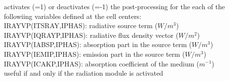 {activates (=1) or deactivates (=-1) the post-processing for the each of the
followiing variables defined at the cell centers:\\
\hspace*{1.3cm} IRAYVP(ITSRAY,IPHAS): radiative source term ($W/m^3$)\\
\hspace*{1.3cm} IRAYVP(IQRAYP,IPHAS): radiative flux density vector ($W/m^2$)\\
\hspace*{1.3cm} IRAYVP(IABSP,IPHAS): absorption part in the source term
($W/m^3$)\\
\hspace*{1.3cm} IRAYVP(IEMIP,IPHAS): emission part in the source term
($W/m^3$)\\
\hspace*{1.3cm} IRAYVP(ICAKP,IPHAS): absorption coefficient of the
medium ($m^{-1}$)\\
useful if and only if the radiation module is activated}


